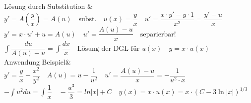 

Lösung durch Substitution & 
$y' = A\left(\dfrac{y}{x}\right) = A(u) \quad \text{subst.}\quad u(x) = \dfrac{y}{x} \quad u' = \dfrac{x\cdot y'-y\cdot1}{x^2} = \dfrac{y'-u}{x} $ \newline 
$y' = x\cdot u' +u = A(u)  \quad u' = \dfrac{A(u)-u}{x} \quad \text{separierbar!}$ \newline 
$\boxed{\int\dfrac{du}{A(u) - u} = \int \dfrac{dx}{x}} \quad \text{Lösung der DGL für } u(x) \quad y = x\cdot u(x)$\\
Anwendung Beispiel&
$y' = \dfrac{y}{x} - \dfrac{x^2}{y^2} \quad A(u) = u - \dfrac{1}{u^2} \quad u' = \dfrac{A(u) - u}{x} = -\dfrac{1}{u^2\cdot x} $\newline 
$-\int u^2 du = \int \dfrac{1}{x} \quad -\dfrac{u^3}{3} = ln|x|+C \quad y(x) = x \cdot u(x) = x\cdot (C -3\ln|x| )^{1/3}$
\\